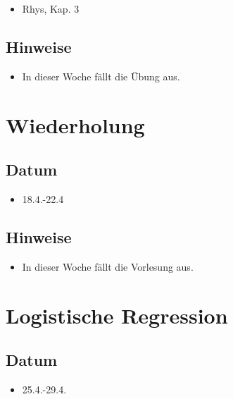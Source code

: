 \documentclass[
]{book}
\providecommand{\tightlist}{%
  \setlength{\itemsep}{0pt}\setlength{\parskip}{0pt}}
\begin{document}
\begin{itemize}
\tightlist
\item
  Rhys, Kap. 3
\end{itemize}

\hypertarget{hinweise-1}{%
\subsection{Hinweise}\label{hinweise-1}}

\begin{itemize}
\tightlist
\item
  In dieser Woche fällt die Übung aus.
\end{itemize}

\hypertarget{wiederholung}{%
\section{Wiederholung}\label{wiederholung}}

\hypertarget{datum-5}{%
\subsection{Datum}\label{datum-5}}

\begin{itemize}
\tightlist
\item
  18.4.-22.4
\end{itemize}

\hypertarget{hinweise-2}{%
\subsection{Hinweise}\label{hinweise-2}}

\begin{itemize}
\tightlist
\item
  In dieser Woche fällt die Vorlesung aus.
\end{itemize}

\hypertarget{logistische-regression}{%
\section{Logistische Regression}\label{logistische-regression}}

\hypertarget{datum-6}{%
\subsection{Datum}\label{datum-6}}

\begin{itemize}
\tightlist
\item
  25.4.-29.4.
\end{itemize}
\end{document}
